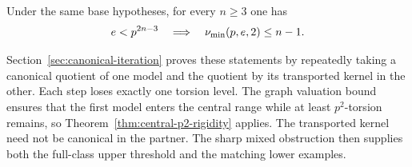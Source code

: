 \begin{corollary}\label{cor:complete-prime-recovery}
Under the same base hypotheses, for every $n\ge3$ one has
\[
 e<p^{2n-3}\quad\Longrightarrow\quad\nu_{\min}(p,e,2)\le n-1.
\]
\end{corollary}

Section~\ref{sec:canonical-iteration} proves these statements by repeatedly taking a canonical quotient of one model and the quotient by its transported kernel in the other. Each step loses exactly one torsion level. The graph valuation bound ensures that the first model enters the central range while at least $p^2$-torsion remains, so Theorem~\ref{thm:central-p2-rigidity} applies. The transported kernel need not be canonical in the partner. The sharp mixed obstruction then supplies both the full-class upper threshold and the matching lower examples.
